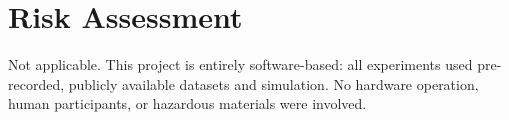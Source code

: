 \chapter{Risk Assessment}
\label{app:risk}

Not applicable. This project is entirely software-based: all experiments used pre-recorded, publicly available datasets and simulation. No hardware operation, human participants, or hazardous materials were involved.
